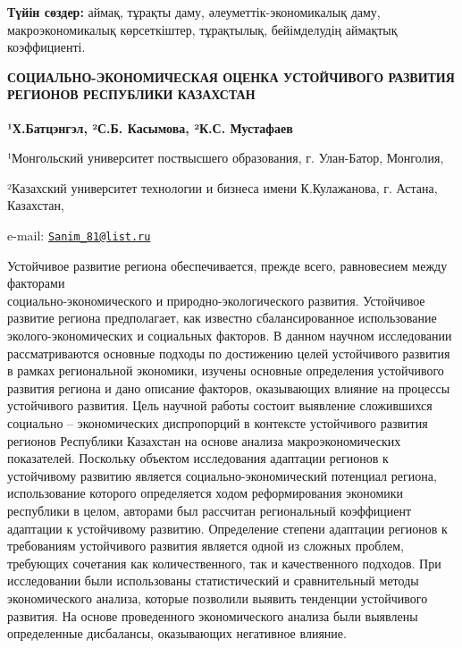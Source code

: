 {\bfseries Түйін сөздер:} аймақ, тұрақты даму, әлеуметтік-экономикалық
даму, макроэкономикалық көрсеткіштер, тұрақтылық, бейімделудің аймақтық
коэффициенті.

\begin{articleheader}
{\bfseries СОЦИАЛЬНО-ЭКОНОМИЧЕСКАЯ ОЦЕНКА УСТОЙЧИВОГО РАЗВИТИЯ РЕГИОНОВ
РЕСПУБЛИКИ КАЗАХСТАН} 

{\bfseries ¹Х.Батцэнгэл\textsuperscript{\envelope }, ²С.Б. Касымова, ²К.С.
Мустафаев}
\end{articleheader}

\begin{affiliation}
¹Монгольский университет поствысшего образования, г. Улан-Батор,
Монголия,

²Казахский университет технологии и бизнеса имени К.Кулажанова, г.
Астана, Казахстан,

e-mail: \href{mailto:Sanim_81@list.ru}{\nolinkurl{Sanim\_81@list.ru}}
\end{affiliation}

Устойчивое развитие региона обеспечивается, прежде всего, равновесием
между факторами \\социально-экономического и природно-экологического
развития. Устойчивое развитие региона предполагает, как известно
сбалансированное использование эколого-экономических и социальных
факторов. В данном научном исследовании рассматриваются основные подходы
по достижению целей устойчивого развития в рамках региональной
экономики, изучены основные определения устойчивого развития региона и
дано описание факторов, оказывающих влияние на процессы устойчивого
развития. Цель научной работы состоит выявление сложившихся социально --
экономических диспропорций в контексте устойчивого развития регионов
Республики Казахстан на основе анализа макроэкономических показателей.
Поскольку объектом исследования адаптации регионов к устойчивому
развитию является социально-экономический потенциал региона,
использование которого определяется ходом реформирования экономики
республики в целом, авторами был рассчитан региональный коэффициент
адаптации к устойчивому развитию. Определение степени адаптации регионов
к требованиям устойчивого развития является одной из сложных проблем,
требующих сочетания как количественного, так и качественного подходов.
При исследовании были использованы статистический и сравнительный методы
экономического анализа, которые позволили выявить тенденции устойчивого
развития. На основе проведенного экономического анализа были выявлены
определенные дисбалансы, оказывающих негативное влияние.

